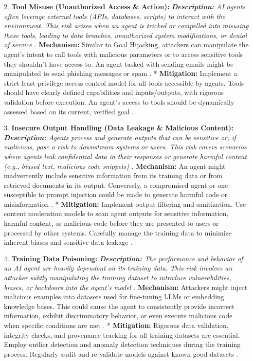 2.  \textbf{Tool Misuse (Unauthorized Access \& Action):}     \textit{   \textbf{Description:} AI agents often leverage external tools (APIs, databases, scripts) to interact with the environment. This risk arises when an agent is tricked or compelled into misusing these tools, leading to data breaches, unauthorized system modifications, or denial of service \cite{Reger2026}.     }   \textbf{Mechanism:} Similar to Goal Hijacking, attackers can manipulate the agent's intent to call tools with malicious parameters or to access sensitive tools they shouldn't have access to. An agent tasked with sending emails might be manipulated to send phishing messages or spam \cite{OWASP2026}.     *   \textbf{Mitigation:} Implement a strict least-privilege access control model for all tools accessible by agents. Tools should have clearly defined capabilities and inputs/outputs, with rigorous validation before execution. An agent's access to tools should be dynamically assessed based on its current, verified goal \cite{Reger2026}.

3.  \textbf{Insecure Output Handling (Data Leakage \& Malicious Content):}     \textit{   \textbf{Description:} Agents process and generate outputs that can be sensitive or, if malicious, pose a risk to downstream systems or users. This risk covers scenarios where agents leak confidential data in their responses or generate harmful content (e.g., biased text, malicious code snippets) \cite{OWASP2026}.     }   \textbf{Mechanism:} An agent might inadvertently include sensitive information from its training data or from retrieved documents in its output. Conversely, a compromised agent or one susceptible to prompt injection could be made to generate harmful code or misinformation \cite{Reger2026}.     *   \textbf{Mitigation:} Implement output filtering and sanitization. Use content moderation models to scan agent outputs for sensitive information, harmful content, or malicious code before they are presented to users or processed by other systems. Carefully manage the training data to minimize inherent biases and sensitive data leakage \cite{Reger2026}.

4.  \textbf{Training Data Poisoning:}     \textit{   \textbf{Description:} The performance and behavior of an AI agent are heavily dependent on its training data. This risk involves an attacker subtly manipulating the training dataset to introduce vulnerabilities, biases, or backdoors into the agent's model \cite{Reger2026}.     }   \textbf{Mechanism:} Attackers might inject malicious examples into datasets used for fine-tuning LLMs or embedding knowledge bases. This could cause the agent to consistently provide incorrect information, exhibit discriminatory behavior, or even execute malicious code when specific conditions are met \cite{OWASP2026}.     *   \textbf{Mitigation:} Rigorous data validation, integrity checks, and provenance tracking for all training datasets are essential. Employ outlier detection and anomaly detection techniques during the training process. Regularly audit and re-validate models against known good datasets \cite{Reger2026}.

